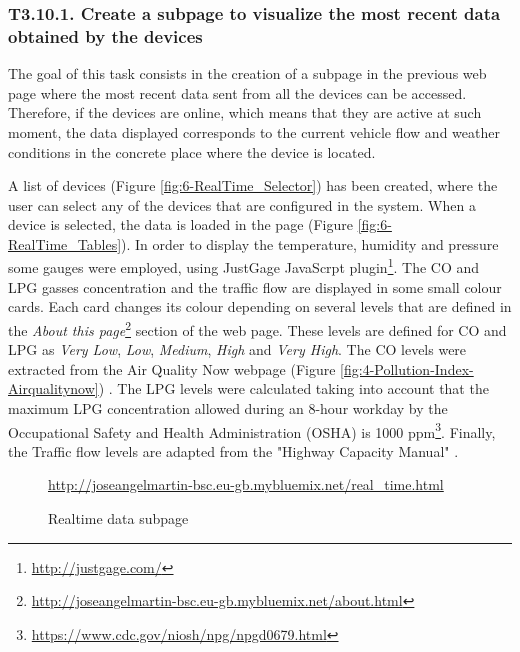 \subsubsection{T3.10.1. Create a subpage to visualize the most recent data obtained by the devices}
The goal of this task consists in the creation of a subpage in the previous web page where the most recent data sent from all the devices can be accessed. Therefore, if the devices are online, which means that they are active at such moment, the data displayed corresponds to the current vehicle flow and weather conditions in the concrete place where the device is located.

A list of devices (Figure \ref{fig:6-RealTime_Selector}) has been created, where the user can select any of the devices that are configured in the system. When a device is selected, the data is loaded in the page (Figure \ref{fig:6-RealTime_Tables}). In order to display the temperature, humidity and pressure some gauges were employed, using JustGage JavaScrpt plugin\footnote{\url{http://justgage.com/}}. The CO and LPG gasses concentration and the traffic flow are displayed in some small colour cards. Each card changes its colour depending on several levels that are defined in the \textit{About this page}\footnote{\url{http://joseangelmartin-bsc.eu-gb.mybluemix.net/about.html}} section of the web page. These levels are defined for CO and LPG as \textit{Very Low}, \textit{Low}, \textit{Medium}, \textit{High} and \textit{Very High}. The CO levels were extracted from the Air Quality Now webpage (Figure \ref{fig:4-Pollution-Index-Airqualitynow}) \cite{airqualitynow}. The LPG levels were calculated taking into account that the maximum LPG concentration allowed during an 8-hour workday by the Occupational Safety and Health Administration (OSHA) is 1000 ppm\footnote{\url{https://www.cdc.gov/niosh/npg/npgd0679.html}}. Finally, the Traffic flow levels are adapted from the "Highway Capacity Manual" \cite{HCM2000}.

\begin{figure}[htb]
	\centering
	\caption{Realtime data subpage}
	\label{fig:6-RealTime}{\url{http://joseangelmartin-bsc.eu-gb.mybluemix.net/real_time.html}}
\end{figure}


